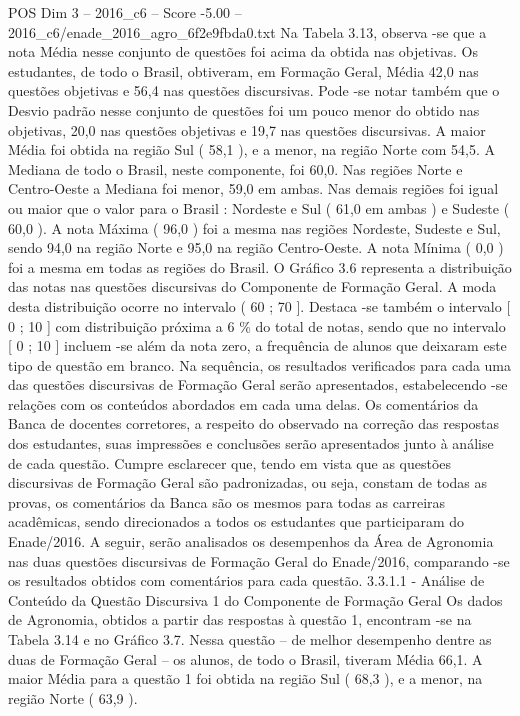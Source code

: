 \begin{textsample}{POS Dim 3 – 2016\_c6 – Score -5.00 – 2016\_c6/enade\_2016\_agro\_6f2e9fbda0.txt}
Na Tabela 3.13, observa -se que a nota Média nesse conjunto de questões foi acima da obtida nas objetivas.
Os estudantes, de todo o Brasil, obtiveram, em Formação Geral, Média 42,0 nas questões objetivas e 56,4 nas questões discursivas.
Pode -se notar também que o Desvio padrão nesse conjunto de questões foi um pouco menor do obtido nas objetivas, 20,0 nas questões objetivas e 19,7 nas questões discursivas.
A maior Média foi obtida na região Sul ( 58,1 ), e a menor, na região Norte com 54,5.
A Mediana de todo o Brasil, neste componente, foi 60,0.
Nas regiões Norte e Centro-Oeste a Mediana foi menor, 59,0 em ambas.
Nas demais regiões foi igual ou maior que o valor para o Brasil : Nordeste e Sul ( 61,0 em ambas ) e Sudeste ( 60,0 ).
A nota Máxima ( 96,0 ) foi a mesma nas regiões Nordeste, Sudeste e Sul, sendo 94,0 na região Norte e 95,0 na região Centro-Oeste.
A nota Mínima ( 0,0 ) foi a mesma em todas as regiões do Brasil.
O Gráfico 3.6 representa a distribuição das notas nas questões discursivas do Componente de Formação Geral.
A moda desta distribuição ocorre no intervalo ( 60 ; 70 ].
Destaca -se também o intervalo [ 0 ; 10 ] com distribuição próxima a 6 \% do total de notas, sendo que no intervalo [ 0 ; 10 ] incluem -se além da nota zero, a frequência de alunos que deixaram este tipo de questão em branco.
Na sequência, os resultados verificados para cada uma das questões discursivas de Formação Geral serão apresentados, estabelecendo -se relações com os conteúdos abordados em cada uma delas.
Os comentários da Banca de docentes corretores, a respeito do observado na correção das respostas dos estudantes, suas impressões e conclusões serão apresentados junto à análise de cada questão.
Cumpre esclarecer que, tendo em vista que as questões discursivas de Formação Geral são padronizadas, ou seja, constam de todas as provas, os comentários da Banca são os mesmos para todas as carreiras acadêmicas, sendo direcionados a todos os estudantes que participaram do Enade/2016.
A seguir, serão analisados os desempenhos da Área de Agronomia nas duas questões discursivas de Formação Geral do Enade/2016, comparando -se os resultados obtidos com comentários para cada questão. 3.3.1.1 - Análise de Conteúdo da Questão Discursiva 1 do Componente de Formação Geral Os dados de Agronomia, obtidos a partir das respostas à questão 1, encontram -se na Tabela 3.14 e no Gráfico 3.7.
Nessa questão – de melhor desempenho dentre as duas de Formação Geral – os alunos, de todo o Brasil, tiveram Média 66,1.
A maior Média para a questão 1 foi obtida na região Sul ( 68,3 ), e a menor, na região Norte ( 63,9 ).

\end{textsample}
